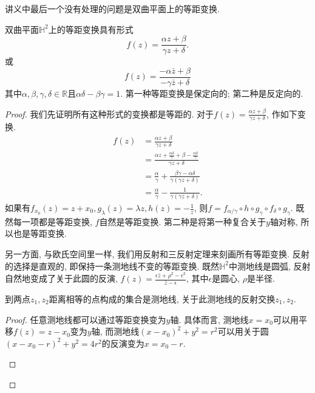 \documentclass[./main.tex]{subfiles}
\begin{document}
讲义中最后一个没有处理的问题是双曲平面上的等距变换.
\begin{theorem}[Poincar\'e, 1882]
    双曲平面\(\mathbb{H}^2\)上的等距变换具有形式
    \[
        f(z)=\frac{\alpha z+\beta}{\gamma z+\delta}.
    \]
    或
    \[
        f(z)=\frac{-\alpha\bar z+\beta}{-\gamma\bar z+\delta}
    \]
    其中\(\alpha,\beta,\gamma,\delta\in\mathbb{R}\)且\(\alpha\delta-\beta\gamma=1\). 第一种等距变换是保定向的; 第二种是反定向的.
\end{theorem}
\begin{proof}
    我们先证明所有这种形式的变换都是等距的. 对于\(f(z)=\frac{\alpha z+\beta}{\gamma z+\delta}\), 作如下变换.
    \begin{align*}
        f(z)&=\frac{\alpha z+\beta}{\gamma z+\delta}\\
            &=\frac{\alpha z+\frac{\alpha\delta}{\gamma}+\beta-\frac{\alpha\delta}{\gamma}}{\gamma z+\delta}\\
            &=\frac{\alpha}{\gamma}+\frac{\beta\gamma-\alpha\delta}{\gamma(\gamma z+\delta)}\\
            &=\frac{\alpha}{\gamma}-\frac{1}{\gamma(\gamma z+\delta)}.
    \end{align*}
    如果有\(f_{x_0}(z)=z+x_0,g_{\lambda}(z)=\lambda z,h(z)=-\frac{1}{z}\), 则\(f=f_{\alpha/\gamma}\circ h\circ g_\gamma\circ f_\delta\circ g_\gamma\). 既然每一项都是等距变换, \(f\)自然是等距变换. 第二种是将第一种复合关于\(y\)轴对称, 所以也是等距变换.

    另一方面, 与欧氏空间里一样, 我们用反射和三反射定理来刻画所有等距变换. 反射的选择是直观的, 即保持一条测地线不变的等距变换. 既然\(\mathbb{H}^2\)中测地线是圆弧, 反射自然地变成了关于此圆的反演, \(f(z)=\frac{\epsilon\bar z+\rho^2-\epsilon^2}{\bar z-\epsilon}\), 其中\(\epsilon\)是圆心, \(\rho\)是半径.
\begin{lemma}
    到两点\(z_1,z_2\)距离相等的点构成的集合是测地线, 关于此测地线的反射交换\(z_1,z_2\).
\end{lemma}
\begin{proof}
    任意测地线都可以通过等距变换变为\(y\)轴. 具体而言, 测地线\(x=x_0\)可以用平移\(f(z)=z-x_0\)变为\(y\)轴, 而测地线\((x-x_0)^2+y^2=r^2\)可以用关于圆\((x-x_0-r)^2+y^2=4r^2\)的反演变为\(x=x_0-r\).
    \begin{figure}[!ht]
        \centering
    \end{figure}


\end{proof}
\end{proof}
\end{document}
